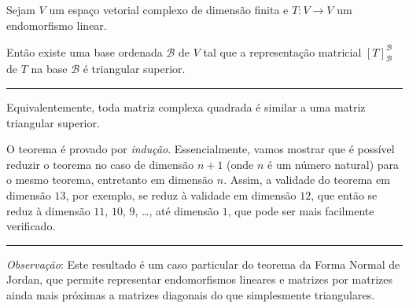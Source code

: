 \begin{theorem}
	Sejam $V$ um espaço vetorial complexo de dimensão finita e $T\colon V\to V$ um endomorfismo linear.
	
	Então existe uma base ordenada $\mathcal{B}$ de $V$ tal que a representação matricial $\left[T\right]_{\mathcal{B}}^{\mathcal{B}}$ de $T$ na base $\mathcal{B}$ é triangular superior.
	
	\hrule
	
	Equivalentemente, toda matriz complexa quadrada é similar a uma matriz triangular superior.
\end{theorem}

O teorema é provado por \textit{indução}. Essencialmente, vamos mostrar que é possível reduzir o teorema no caso de dimensão $n+1$ (onde $n$ é um número natural) para o mesmo teorema, entretanto em dimensão $n$. Assim, a validade do teorema em dimensão $13$, por exemplo, se reduz à validade em dimensão $12$, que então se reduz à dimensão $11$, $10$, $9$, \ldots, até dimensão $1$, que pode ser mais facilmente verificado.

\hrule

\textit{Observação}: Este resultado é um caso particular do teorema da Forma Normal de Jordan, que permite representar endomorfismos lineares e matrizes por matrizes ainda mais próximas a matrizes diagonais do que simplesmente triangulares.

